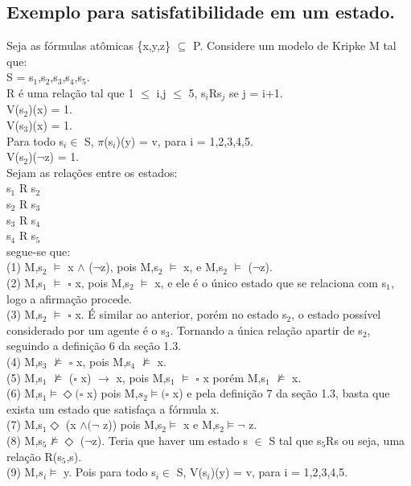 \documentclass[12pt]{report}
\begin{document}
 \subsection{Exemplo para satisfatibilidade em um estado.}%
\hspace{0.5cm} Seja as fórmulas atômicas \{x,y,z\} $\subseteq $ P. Considere um modelo de Kripke M tal que:\\
S = s$_{1}$,s$_{2}$,s$_{3}$,s$_{4}$,s$_{5}$.\\
R é uma relação tal que 1 $\leq $ i,j $\leq$ 5, s$_{i}$Rs$_{j}$ se j = i+1.\\
V(s$_{2}$)(x) = 1. \\
V(s$_{3}$)(x) = 1. \\
Para todo s$_{i}\in$ S, $\pi$(s$_{i}$)(y) = v, para i = 1,2,3,4,5.\\
V(s$_{2}$)($\neg$z) = 1.\\
Sejam as relações entre os estados:\\
s$_{1}$ R s$_{2}$\\
s$_{2}$ R s$_{3}$\\
s$_{3}$ R s$_{4}$\\
s$_{4}$ R s$_{5}$\\    
segue-se que:\\
(1) M,s$_{2}$ $\models$ x $\wedge$ ($\neg$z), pois M,s$_{2}$ $\models$ x, e M,s$_{2}$ $\models$ ($\neg$z).\\
(2) M,s$_{1}$ $\models$ $\square$ x, pois M,s$_{2}$ $\models$ x, e ele é o único estado que se relaciona com s$_{1}$, logo a afirmação procede.\\
(3) M,s$_{2}$ $\models$ $\square$ x. É similar ao anterior, porém no estado s$_{2}$, o estado possível considerado por um agente é o s$_{3}$. Tornando a única relação apartir de s$_{2}$, seguindo a definição 6 da seção 1.3.\\
(4) M,s$_{3}$ $\nvDash$ $\square$ x, pois M,s$_{4}$ $\nvDash$ x.\\
(5) M,s$_{1}$ $\nvDash$ ($\square$ x) $\rightarrow$ x, pois M,s$_{1}$ $\models$ $\square$ x porém M,s$_{1}$ $\nvDash$ x.\\
(6) M,s$_{1} \models   \Diamond (\square$ x) pois M,$s_{2} \models (\square$ x) e pela definição 7 da seção 1.3, basta que exista um estado que satisfaça a fórmula x.\\
(7) M,s$_{1}\Diamond$ (x $\wedge (\neg$ z)) pois M,s$_{2} \models$ x e M,s$_{2} \models \neg$ z.\\
(8) M,s$_{5} \nvDash \Diamond$ ($\neg$z). Teria que haver um estado s $\in $ S tal que s$_{5}$Rs ou seja, uma relação R(s$_{5}$,s).\\
(9) M,$s_{i}\models$ y. Pois para todo s$_{i}\in$ S, V(s$_{i}$)(y) = v, para i = 1,2,3,4,5.
\end{document}
